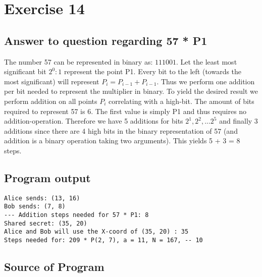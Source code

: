 \documentclass[a4paper]{article}
\begin{document}
\section*{Exercise 14}

\subsection*{Answer to question regarding 57 * P1}
The number 57 can be represented in binary as: $111001$. Let the
least most significant bit $2^{0} : 1$ represent the point P1. Every
bit to the left (towards the most significant) will represent
$P_i = P_{i-1} + P_{i-1}$. Thus we perform one addition per bit needed
to represent the multiplier in binary. To yield the desired result we
perform addition on all points $P_i$ correlating with a high-bit. The
amount of bits required to represent 57 is 6. The first value is simply
P1 and thus requires no addition-operation. Therefore we have 5 additions
for bits ${2^1, 2^2, ... 2^5}$ and finally 3 additions since there are
4 high bits in the binary representation of 57 (and addition is a binary operation
taking two arguments). This yields 5 + 3 = 8 steps.

\subsection*{Program output}

\begin{verbatim}
Alice sends: (13, 16)
Bob sends: (7, 8)
--- Addition steps needed for 57 * P1: 8
Shared secret: (35, 20)
Alice and Bob will use the X-coord of (35, 20) : 35
Steps needed for: 209 * P(2, 7), a = 11, N = 167, -- 10
\end{verbatim}

\subsection*{Source of Program}
\end{document}
